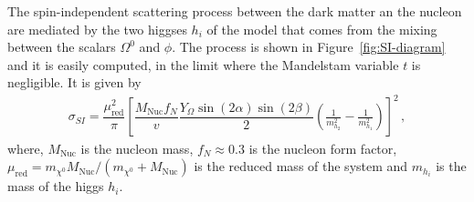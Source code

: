\documentclass[12pt,letterpaper]{article}
\begin{document}
%
The spin-independent scattering process between the dark matter an the nucleon are mediated by the two higgses $h_i$ of the model that comes from the mixing between the scalars $\Omega^0$ and $\phi$. The process is shown in Figure~\ref{fig:SI-diagram} and it is easily computed, in the limit where the  Mandelstam variable $t$ is negligible. It is given by
%
\begin{align}
\label{eq:sigma-SI}
\sigma_{SI}=\dfrac{\mu_{\text{red}}^2}{\pi}\left[\dfrac{M_{\text{Nuc}}f_N}{v}\dfrac{Y_{\Omega}\sin(2\alpha)\sin(2\beta)}{2}\left(\frac{1}{m_{h_2}^2}-\frac{1}{m_{h_1}^2}\right)\right]^2\,,
\end{align}
%
where, $M_{\text{Nuc}}$ is the nucleon mass, $f_N\approx 0.3$ is the nucleon form factor, $\mu_{\text{red}}= m_{\chi^0}M_{\text{Nuc}}/(m_{\chi^0}+M_{\text{Nuc}})$ is the reduced mass of the system and  $m_{h_i}$ is the mass of the higgs $h_i$.
\end{document}
